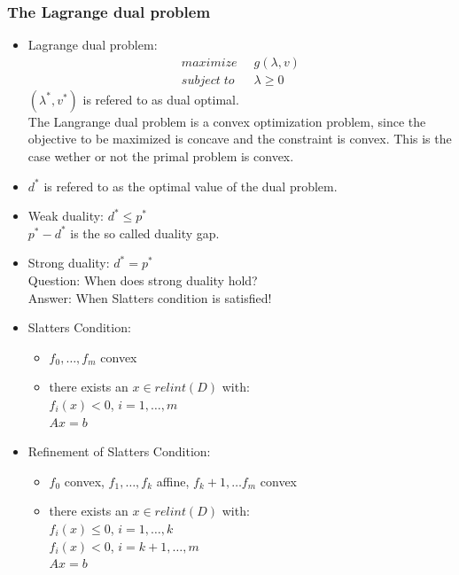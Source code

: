 \subsubsection*{The Lagrange dual problem}
\begin{itemize}
    \item
        Lagrange dual problem:
        \begin{align*}
            maximize \;\; & g(\lambda, v)\\
            subject \; to \; \; & \lambda \geq 0
        \end{align*}
        $(\lambda^*, v^*)$ is refered to as dual optimal.\\
        The Langrange dual problem is a convex optimization problem, since the objective to be maximized is concave and the constraint is convex. This is the case wether or not the primal problem is convex.
    \item
        $d^*$ is refered to as the optimal value of the dual problem. 
    \item     
        Weak duality: $d^* \leq p^*$\\
        $p^* - d^*$ is the so called duality gap.
    \item
        Strong duality: $d^* = p^*$\\
        Question: When does strong duality hold?\\
        Answer: When Slatters condition is satisfied!
    \item
        Slatters Condition:
        \begin{itemize}
            \item
                $f_0,\dots,f_m$ convex
            \item
                there exists an $x \in relint(D)$ with:\\
                $f_i(x) < 0$, $i=1,\dots,m$\\
                $Ax = b$
        \end{itemize}
    \item
        Refinement of Slatters Condition:
        \begin{itemize}
            \item
                $f_0$ convex, $f_1, \dots, f_k$ affine, $f_k+1, \dots f_m$ convex
            \item
                there exists an $x \in relint(D)$ with:\\
                $f_i(x) \leq 0$, $i=1,\dots, k$\\
                $f_i(x) < 0$, $i=k+1, \dots, m$\\
                $Ax = b$
                
        \end{itemize}
\end{itemize}
